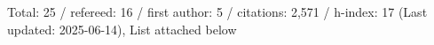 Total: 25 / refereed: 16 / first author: 5 / citations: 2,571 / h-index: 17 (Last updated: 2025-06-14), List attached below